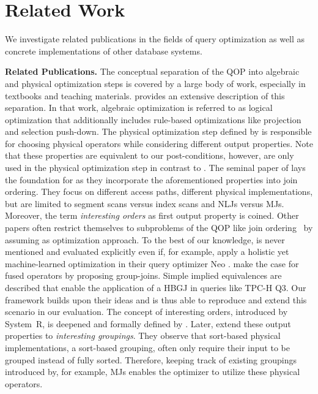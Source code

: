 \section{Related Work}
\label{sec:related_work}

We investigate related publications in the fields of query optimization as well as concrete implementations of other database systems.

\textbf{Related Publications.}
The conceptual separation of the QOP into algebraic and physical optimization steps is covered by a large body of work, especially in textbooks and teaching materials.   provides an extensive description of this separation.  In that work, algebraic optimization is referred to as logical optimization that additionally includes rule-based optimizations like projection and selection push-down.  The physical optimization step defined by \citeauthor{book_moerkotte} is responsible for choosing physical operators while considering different output properties.  Note that these properties are equivalent to our post-conditions, however, are only used in the physical optimization step in contrast to \holistic.
The seminal paper of  lays the foundation for \holistic as they incorporate the aforementioned properties into join ordering.  They focus on different access paths, \ie different physical implementations, but are limited to segment scans versus index scans and NLJs versus MJs.  Moreover, the term \emph{interesting orders} as first output property is coined.
Other papers often restrict themselves to subproblems of the QOP like join ordering~\cite{mutable_join_ordering, dp_ccp, dp_sub} by assuming \split as optimization approach.  To the best of our knowledge, \holistic is never mentioned and evaluated explicitly even if, for example,  apply a holistic yet machine-learned optimization in their query optimizer Neo .
 make the case for fused operators by proposing group-joins.  Simple implied equivalences are described that enable the application of a HBGJ in queries like TPC-H Q3.  Our framework builds upon their ideas and is thus able to reproduce and extend this scenario in our evaluation.
The concept of interesting orders, introduced by System~R, is deepened and formally defined by .  Later,  extend these output properties to \emph{interesting groupings}.  They observe that sort-based physical implementations, \eg a sort-based grouping, often only require their input to be grouped instead of fully sorted.  Therefore, keeping track of existing groupings introduced by, for example, MJs enables the optimizer to utilize these physical operators.

